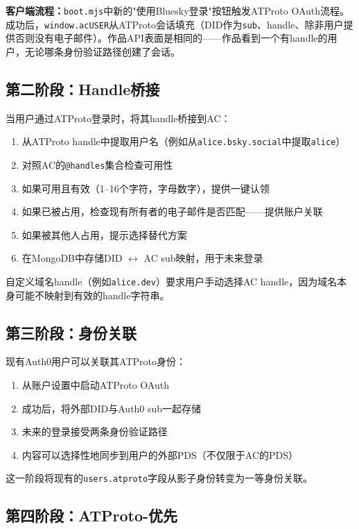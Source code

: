 \documentclass[10pt,letterpaper,twocolumn]{article}
\begin{document}
\textbf{客户端流程：}\texttt{boot.mjs}中新的"使用Bluesky登录"按钮触发ATProto OAuth流程。成功后，\texttt{window.acUSER}从ATProto会话填充（DID作为\texttt{sub}、handle、除非用户提供否则没有电子邮件）。作品API表面是相同的——作品看到一个有handle的用户，无论哪条身份验证路径创建了会话。

\subsection{第二阶段：Handle桥接}

当用户通过ATProto登录时，将其handle桥接到AC：

\begin{enumerate}
  \item 从ATProto handle中提取用户名（例如从\texttt{alice.bsky.social}中提取\texttt{alice}）
  \item 对照AC的\texttt{@handles}集合检查可用性
  \item 如果可用且有效（1--16个字符，字母数字），提供一键认领
  \item 如果已被占用，检查现有所有者的电子邮件是否匹配——提供账户关联
  \item 如果被其他人占用，提示选择替代方案
  \item 在MongoDB中存储DID $\leftrightarrow$ AC sub映射，用于未来登录
\end{enumerate}

自定义域名handle（例如\texttt{alice.dev}）要求用户手动选择AC handle，因为域名本身可能不映射到有效的handle字符串。

\subsection{第三阶段：身份关联}

现有Auth0用户可以关联其ATProto身份：

\begin{enumerate}
  \item 从账户设置中启动ATProto OAuth
  \item 成功后，将外部DID与Auth0 sub一起存储
  \item 未来的登录接受两条身份验证路径
  \item 内容可以选择性地同步到用户的外部PDS（不仅限于AC的PDS）
\end{enumerate}

这一阶段将现有的\texttt{users.atproto}字段从影子身份转变为一等身份关联。

\subsection{第四阶段：ATProto-优先}
\end{document}
